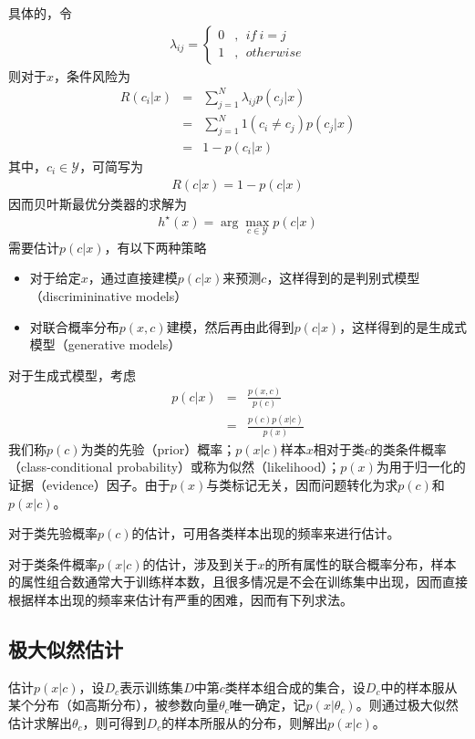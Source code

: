 具体的，令
\begin{eqnarray}
\lambda_{ij}=
\left\lbrace
\begin{aligned}
0 &,\ \ if\ i=j\\
1 &,\ \ otherwise
\end{aligned}
\right.
\end{eqnarray}
则对于$x$，条件风险为
\begin{eqnarray}
R(c_i|x) &=& \sum_{j=1}^N\lambda_{ij}p(c_j|x)\\
&=& \sum_{j=1}^N 1(c_i\neq c_j)p(c_j|x)\\
&=& 1-p(c_i|x)
\end{eqnarray}
其中，$c_i\in \mathcal{Y}$，可简写为
\begin{eqnarray}
R(c|x)=1-p(c|x)
\end{eqnarray}
因而贝叶斯最优分类器的求解为
\begin{eqnarray}
h^\star(x)=\arg\max_{c\in\mathcal{Y}}p(c|x)
\end{eqnarray}
需要估计$p(c|x)$，有以下两种策略
\begin{itemize}
\item 对于给定$x$，通过直接建模$p(c|x)$来预测$c$，这样得到的是判别式模型（discrimininative models）
\item 对联合概率分布$p(x,c)$建模，然后再由此得到$p(c|x)$，这样得到的是生成式模型（generative models）
\end{itemize}
对于生成式模型，考虑
\begin{eqnarray}
p(c|x) &=& \frac{p(x,c)}{p(c)}\\
&=& \frac{p(c)p(x|c)}{p(x)}
\end{eqnarray}
我们称$p(c)$为类的先验（prior）概率；$p(x|c)$样本$x$相对于类$c$的类条件概率（class-conditional probability）或称为似然（likelihood）；$p(x)$为用于归一化的证据（evidence）因子。由于$p(x)$与类标记无关，因而问题转化为求$p(c)$和$p(x|c)$。

对于类先验概率$p(c)$的估计，可用各类样本出现的频率来进行估计。

对于类条件概率$p(x|c)$的估计，涉及到关于$x$的所有属性的联合概率分布，样本的属性组合数通常大于训练样本数，且很多情况是不会在训练集中出现，因而直接根据样本出现的频率来估计有严重的困难，因而有下列求法。

\subsection{极大似然估计}
估计$p(x|c)$，设$D_c$表示训练集$D$中第$c$类样本组合成的集合，设$D_c$中的样本服从某个分布（如高斯分布），被参数向量$\theta_c$唯一确定，记$p(x|\theta_c)$。则通过极大似然估计求解出$\theta_c$，则可得到$D_c$的样本所服从的分布，则解出$p(x|c)$。


